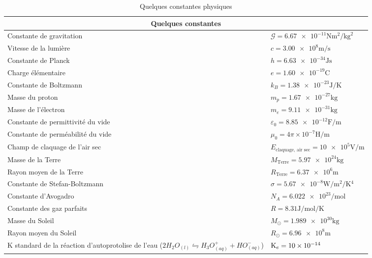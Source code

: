 \documentclass[10pt,a4paper,titlepage,landscape]{article}
\renewcommand{\arraystretch}{2}
\begin{document}
\begin{table}[H]
    \centering
    \renewcommand{\arraystretch}{1.5} %
    \setlength{\tabcolsep}{8pt} %
    \begin{tabular}{@{}|p{9cm}|p{10cm}@{}|}
        \multicolumn{2}{c}{\textbf{Quelques constantes}} \\ \hline

    Constante de gravitation & $\mathcal{G} = \num{6,67e-11} \unit{\newton\meter\squared\per\kilogram\squared}$ \\ \hline 
    Vitesse de la lumière & $c = \num{3,00e8} \unit{\meter\per\second}$ \\ \hline 
    Constante de Planck & $h = \num{6,63e-34} \unit{\joule\second}$ \\ \hline 
    Charge élémentaire & $e = \num{1,60e-19} \unit{\coulomb}$ \\ \hline 
    Constante de Boltzmann & $k_B = \num{1,38e-23} \unit{\joule\per\kelvin}$ \\ \hline 
    Masse du proton & $m_p = \num{1,67e-27} \unit{\kilogram}$ \\ \hline 
    Masse de l'électron & $m_e = \num{9,11e-31} \unit{\kilogram}$ \\ \hline 
    Constante de permittivité du vide & $\varepsilon_0 = \num{8,85e-12} \unit{\farad\per\meter}$ \\ \hline 
    Constante de perméabilité du vide & $\mu_0 = {4\pi\times 10^{-7}} \unit{\henry\per\meter}$ \\ \hline 
    Champ de claquage de l'air sec &$ E_{\text{claquage, air sec}} = \num{10e5} \unit{\volt\per\meter}$ \\ \hline
    Masse de la Terre & $M_\text{Terre} = \num{5,97e24} \unit{\kilogram}$ \\ \hline 
    Rayon moyen de la Terre & $R_\text{Terre} = \num{6,37e6} \unit{\meter}$ \\ \hline 
    Constante de Stefan-Boltzmann & $\sigma = \num{5,67e-8} \unit{\watt\per\meter\squared\per\kelvin^4}$ \\ \hline 
    Constante d'Avogadro & $N_A = \num{6,022e23} \unit{\per\mole}$ \\ \hline 
    Constante des gaz parfaits & $R = \num{8,31} \unit{\joule\per\mole\per\kelvin}$ \\ \hline 
    Masse du Soleil & $M_\odot = \num{1,989e30} \unit{\kilogram}$ \\ \hline  
    Rayon moyen du Soleil & $R_\odot = \num{6,96e8} \unit{\meter}$ \\ \hline 
    K standard de la réaction d'autoprotolise de l'eau ($2H_2 O_{(l)} \leftrightharpoons H_3O^+_{(aq)} + HO^-_{(aq)}$) & $\mathrm{K}_e= \num{10e{-14}}$ \\ \hline
\end{tabular}
\caption{Quelques constantes physiques}
\label{tab:constantes}
\end{table}
\end{document}
